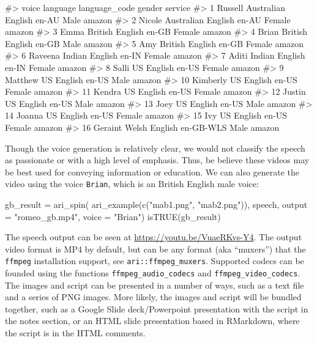 \begin{Schunk}
\begin{Soutput}
#>       voice           language language_code gender service
#> 1   Russell Australian English         en-AU   Male  amazon
#> 2    Nicole Australian English         en-AU Female  amazon
#> 3      Emma    British English         en-GB Female  amazon
#> 4     Brian    British English         en-GB   Male  amazon
#> 5       Amy    British English         en-GB Female  amazon
#> 6   Raveena     Indian English         en-IN Female  amazon
#> 7     Aditi     Indian English         en-IN Female  amazon
#> 8     Salli         US English         en-US Female  amazon
#> 9   Matthew         US English         en-US   Male  amazon
#> 10 Kimberly         US English         en-US Female  amazon
#> 11   Kendra         US English         en-US Female  amazon
#> 12   Justin         US English         en-US   Male  amazon
#> 13     Joey         US English         en-US   Male  amazon
#> 14   Joanna         US English         en-US Female  amazon
#> 15      Ivy         US English         en-US Female  amazon
#> 16  Geraint      Welsh English     en-GB-WLS   Male  amazon
\end{Soutput}
\end{Schunk}

Though the voice generation is relatively clear, we would not classify
the speech as passionate or with a high level of emphasis. Thus, be
believe these videos may be best used for conveying information or
education. We can also generate the video using the voice
\texttt{Brian}, which is an British English male voice:

\begin{Schunk}
\begin{Sinput}
gb_result = ari_spin(
  ari_example(c("mab1.png", "mab2.png")),
  speech, output = "romeo_gb.mp4", voice = "Brian")
isTRUE(gb_result)
\end{Sinput}
\end{Schunk}

The speech output can be seen at \url{https://youtu.be/VuaeRKvs-Y4}. The
output video format is MP4 by default, but can be any format (aka
``muxers'') that the \texttt{ffmpeg} installation support, see
\texttt{ari::ffmpeg\_muxers}. Supported codecs can be founded using the
functions \texttt{ffmpeg\_audio\_codecs} and
\texttt{ffmpeg\_video\_codecs}. The images and script can be presented
in a number of ways, such as a text file and a series of PNG images.
More likely, the images and script will be bundled together, such as a
Google Slide deck/Powerpoint presentation with the script in the notes
section, or an HTML slide presentation based in RMarkdown, where the
script is in the HTML comments.

